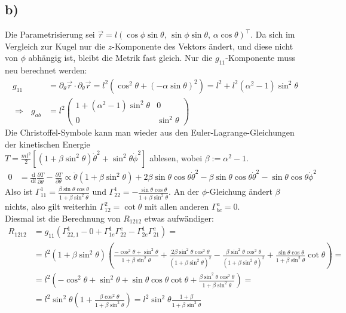 \documentclass[a4paper,12pt]{article}
\newcommand{\kla}{}
\newcommand{\klam}{}
\newcommand{\tecxt}{}
\begin{document}
\subsection*{b)}
Die Parametrisierung sei $\vec{r}=l\kla\left( {\cos\phi\sin\theta ,\, \sin\phi\sin\theta ,\, \alpha\cos\theta} \right)^\top$. Da sich im Vergleich zur Kugel nur die $z$-Komponente des Vektors ändert, und diese nicht von $\phi$ abhängig ist, bleibt die Metrik fast gleich. Nur die $g_{11}$-Komponente muss neu berechnet werden:
\begin{align*}
g_{11}&=\partial_\theta\vec{r}\cdot\partial_\theta\vec{r}=l^2\kla\left( {\cos^2\theta+(-\alpha\sin\theta)^2} \right)=l^2+l^2(\alpha^2-1)\sin^2\theta\\
\Rightarrow\ \ \ g_{ab}&=l^2\begin{pmatrix}
1+(\alpha^2-1)\sin^2\theta & 0 \\ 0 & \sin^2\theta
\end{pmatrix}
\end{align*}
Die Christoffel-Symbole kann man wieder aus den Euler-Lagrange-Gleichungen der kinetischen Energie\\
$T=\frac{ml^2}{2}\klam\left[ {(1+\beta\sin^2\theta)\dot{\theta}^2+\sin^2\theta\dot{\phi}^2} \right]$ ablesen, wobei $\beta:=\alpha^2-1$.
\begin{align*}
0&=\frac{\tecxt\text{d}}{\tecxt\text{d}t}\frac{\partial T}{\partial \dot{\theta}}-\frac{\partial T}{\partial\theta}\propto \ddot{\theta}(1+\beta\sin^2\theta)+2\beta\sin\theta\cos\theta\dot{\theta}^2-\beta\sin\theta\cos\theta\dot{\theta}^2-\sin\theta\cos\theta\dot{\phi}^2
\end{align*}
Also ist $\Gamma^1_{11}=\frac{\beta\sin\theta\cos\theta}{1+\beta\sin^2\theta}$ und $\Gamma^1_{22}=-\frac{\sin\theta\cos\theta}{1+\beta\sin^2\theta}$. An der $\phi$-Gleichung ändert $\beta$ nichts, also gilt weiterhin $\Gamma^2_{12}=\cot\theta$ mit allen anderen $\Gamma^a_{bc}=0$.\\
Diesmal ist die Berechnung von $R_{1212}$ etwas aufwändiger:
\begin{align*}
R_{1212}&=g_{11}\kla\left( {\Gamma^1_{22,1}-0+\Gamma^1_{1e}\Gamma^e_{22}-\Gamma^1_{2e}\Gamma^e_{21}} \right)=\\
&=l^2(1+\beta\sin^2\theta)\kla\left( {\frac{-\cos^2\theta+\sin^2\theta}{1+\beta\sin^2\theta}+\frac{2\beta\sin^2\theta\cos^2\theta}{(1+\beta\sin^2\theta)^2}-\frac{\beta\sin^2\theta\cos^2\theta}{(1+\beta\sin^2\theta)^2}+\frac{\sin\theta\cos\theta}{1+\beta\sin^2\theta}\cot\theta} \right)=\\
&=l^2\kla\left( {-\cos^2\theta+\sin^2\theta+\sin\theta\cos\theta\cot\theta+\frac{\beta\sin^2\theta\cos^2\theta}{1+\beta\sin^2\theta}} \right)=\\
&=l^2\sin^2\theta\kla\left( {1+\frac{\beta\cos^2\theta}{1+\beta\sin^2\theta}} \right)=l^2\sin^2\theta\frac{1+\beta}{1+\beta\sin^2\theta}
\end{align*}
\end{document}
